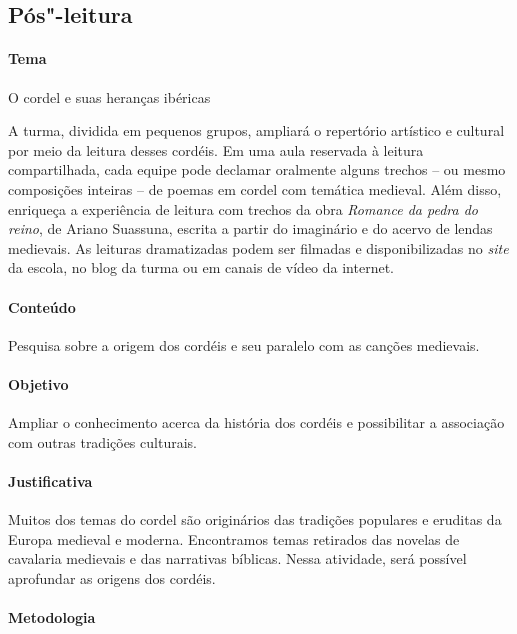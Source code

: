 \documentclass[12pt]{extarticle}
\begin{document}


\subsection{Pós"-leitura}

\paragraph{Tema} O cordel e suas heranças ibéricas

A turma, dividida em pequenos grupos, ampliará o repertório artístico 
e cultural por meio da leitura desses cordéis. Em uma aula reservada 
à leitura compartilhada, cada equipe pode declamar oralmente alguns trechos 
-- ou mesmo composições inteiras -- de poemas em cordel com temática 
medieval. Além disso, enriqueça a experiência de leitura com trechos da obra 
\emph{Romance da pedra do reino}, de Ariano Suassuna, escrita a partir do 
imaginário e do acervo de lendas medievais. As leituras dramatizadas podem 
ser filmadas e disponibilizadas no \emph{site} da escola, no blog da turma ou 
em canais de vídeo da internet.

\paragraph{Conteúdo} Pesquisa sobre a origem dos cordéis e seu paralelo com as
canções medievais.

\paragraph{Objetivo} Ampliar o conhecimento acerca da história dos cordéis
e possibilitar a associação com outras tradições culturais.

\paragraph{Justificativa} Muitos dos temas do cordel são originários das
tradições populares e eruditas da Europa medieval e moderna. Encontramos temas
retirados das novelas de cavalaria medievais e das narrativas bíblicas. Nessa
atividade, será possível aprofundar as origens dos cordéis.

\paragraph{Metodologia}
\end{document}
